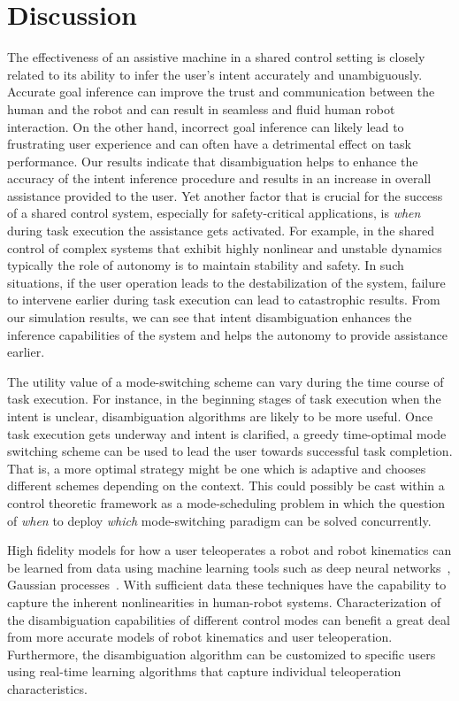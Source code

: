 \documentclass[conference]{IEEEtran}
\begin{document}
\section{Discussion}\label{sec:discussions}

The effectiveness of an assistive machine in a shared control setting is closely related to its ability to infer the user's intent accurately and unambiguously. Accurate goal inference can improve the trust and communication between the human and the robot and can result in seamless and fluid human robot interaction. On the other hand, incorrect goal inference can likely lead to frustrating user experience and can often have a detrimental effect on task performance. Our results indicate that disambiguation helps to enhance the accuracy of the intent inference procedure and results in an increase in overall assistance provided to the user. Yet another factor that is crucial for the success of a shared control system, especially for safety-critical applications, is \textit{when} during task execution the assistance gets activated. For example, in the shared control of complex systems that exhibit highly nonlinear and unstable dynamics typically the role of autonomy is to maintain stability and safety. In such situations, if the user operation leads to the destabilization of the system, failure to intervene earlier during task execution can lead to catastrophic results. From our simulation results, we can see that intent disambiguation enhances the inference capabilities of the system and helps the autonomy to provide assistance earlier.

The utility value of a mode-switching scheme can vary during the time course of task execution. For instance, in the beginning stages of task execution when the intent is unclear, disambiguation algorithms are likely to be more useful. Once task execution gets underway and intent is clarified, a greedy time-optimal mode switching scheme can be used to lead the user towards successful task completion. That is, a more optimal strategy might be one which is adaptive and chooses different schemes depending on the context. This could possibly be cast within a control theoretic framework as a mode-scheduling problem in which the question of \textit{when} to deploy \textit{which} mode-switching paradigm can be solved concurrently. 

High fidelity models for how a user teleoperates a robot and robot kinematics can be learned from data using machine learning tools such as deep neural networks~\citep{nagabandi2017neural}, Gaussian processes~\citep{wang2013probabilistic}. With sufficient data these techniques have the capability to capture the inherent nonlinearities in human-robot systems. Characterization of the disambiguation capabilities of different control modes can benefit a great deal from more accurate models of robot kinematics and user teleoperation. Furthermore, the disambiguation algorithm can be customized to specific users using real-time learning algorithms that capture individual teleoperation characteristics. 
\end{document}
